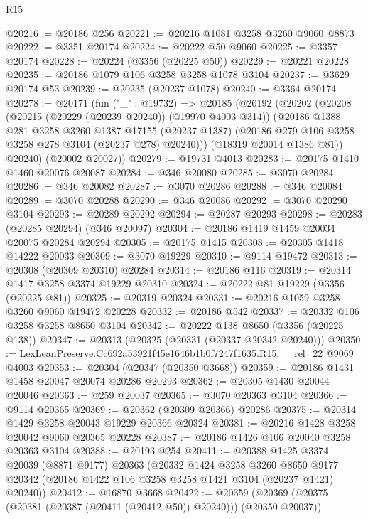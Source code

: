 \begin{lexlean}{R15}
\begin{coremodule}
@20216 := @20186 @256
@20221 := @20216 @1081 @3258 @3260 @9060 @8873
@20222 := @3351 @20174
@20224 := @20222 @50 @9060
@20225 := @3357 @20174
@20228 := @20224 (@3356 (@20225 @50))
@20229 := @20221 @20228
@20235 := @20186 @1079 @106 @3258 @3258 @1078 @3104
@20237 := @3629 @20174 @53
@20239 := @20235 (@20237 @1078)
@20240 := @3364 @20174
@20278 := @20171
    (fun ("_" : @19732) =>
    @20185
      (@20192
        (@20202
          (@20208
            (@20215 (@20229 (@20239 @20240)) (@19970 @4003 @314))
            (@20186
              @1388
              @281
              @3258
              @3260
              @1387
              @17155
              (@20237 @1387)
              (@20186 @279 @106 @3258 @3258 @278 @3104 (@20237 @278) @20240)))
          (@18319 @20014 @1386 @81))
        @20240)
      (@20002 @20027))
@20279 := @19731 @4013
@20283 := @20175 @1410 @1460 @20076 @20087
@20284 := @346 @20080
@20285 := @3070 @20284
@20286 := @346 @20082
@20287 := @3070 @20286
@20288 := @346 @20084
@20289 := @3070 @20288
@20290 := @346 @20086
@20292 := @3070 @20290 @3104
@20293 := @20289 @20292
@20294 := @20287 @20293
@20298 := @20283 (@20285 @20294) (@346 @20097)
@20304 := @20186 @1419 @1459 @20034 @20075 @20284 @20294
@20305 := @20175 @1415
@20308 := @20305 @1418 @14222 @20033
@20309 := @3070 @19229
@20310 := @9114 @19472
@20313 := @20308 (@20309 @20310) @20284
@20314 := @20186 @116
@20319 := @20314 @1417 @3258 @3374 @19229 @20310
@20324 := @20222 @81 @19229 (@3356 (@20225 @81))
@20325 := @20319 @20324
@20331 := @20216 @1059 @3258 @3260 @9060 @19472 @20228
@20332 := @20186 @542
@20337 := @20332 @106 @3258 @3258 @8650 @3104
@20342 := @20222 @138 @8650 (@3356 (@20225 @138))
@20347 := @20313 (@20325 (@20331 (@20337 @20342 @20240)))
@20350 := LexLeanPreserve.Cc692a53921f45e1646b1b0f7247f1635.R15.__rel_22 @9069 @4003
@20353 := @20304 (@20347 (@20350 @3668))
@20359 := @20186 @1431 @1458 @20047 @20074 @20286 @20293
@20362 := @20305 @1430 @20044 @20046
@20363 := @259 @20037
@20365 := @3070 @20363 @3104
@20366 := @9114 @20365
@20369 := @20362 (@20309 @20366) @20286
@20375 := @20314 @1429 @3258 @20043 @19229 @20366 @20324
@20381 := @20216 @1428 @3258 @20042 @9060 @20365 @20228
@20387 := @20186 @1426 @106 @20040 @3258 @20363 @3104
@20388 := @20193 @254
@20411 := @20388
    @1425
    @3374
    @20039
    (@8871 @9177)
    @20363
    (@20332
      @1424
      @3258
      @3260
      @8650
      @9177
      @20342
      (@20186 @1422 @106 @3258 @3258 @1421 @3104 (@20237 @1421) @20240))
@20412 := @16870 @3668
@20422 := @20359 (@20369 (@20375 (@20381 (@20387 (@20411 (@20412 @50)) @20240))) (@20350 @20037))

\end{coremodule}
\end{lexlean}
